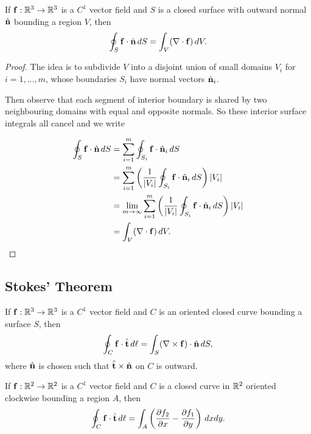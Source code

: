 \documentclass[10pt, a4paper]{article}
\begin{document}
\begin{theorem}
    If $\mbf{f} : \R ^ 3 \to \R ^ 3$ is a $C ^ {1}$ vector field and $S$ is a closed surface with outward normal $\hat{\mbf{n}}$ bounding a region $V$,
    then
    \[
    \oint_{S}\mbf{f}\cdot\hat{\mbf{n}}\,dS = \int_{V}(\bnabla \cdot \mbf{f})\,dV.
    \]

    \begin{proof}
        The idea is to subdivide $V$ into a disjoint union of small domains $V_i$ for $i = 1, \dotsc, m$,
        whose boundaries $S_i$ have normal vectors $\hat{\mbf{n}}_i$.


        Then observe that each segment of interior boundary is shared by two neighbouring domains with equal and opposite normals.
        So these interior surface integrals all cancel and we write
        
        \begin{align*}
            \oint_{S}\mbf{f} \cdot \hat{\mbf{n}}\,dS &= \sum_{i = 1}^{m}\oint_{S_i}\mbf{f} \cdot \hat{\mbf{n}}_i\,dS \\
            &= \sum_{i = 1}^{m}\left(\frac{1}{|V_i|}\oint_{S_i}\mbf{f}\cdot\hat{\mbf{n}}_i\,dS\right)|V_i| \\
            &= \lim_{m \to \infty}\sum_{i = 1}^{m}\left(\frac{1}{|V_i|}\oint_{S_i}\mbf{f} \cdot \hat{\mbf{n}}_i\,dS\right)|V_i| \\
            &= \int_{V}(\bnabla \cdot \mbf{f})\,dV.
        \end{align*}
    \end{proof}
\end{theorem}

\subsection{Stokes' Theorem}

\begin{theorem}\label{prep:mathmethII:thm:stokesthm}
    If $\mbf{f} : \R ^ 3 \to \R ^ 3$ is a $C ^ {1}$ vector field and $C$ is an oriented closed curve bounding a surface $S$,
    then
    \[
    \oint_{C}\mbf{f}\cdot\hat{\mbf{t}}\,d\ell = \int_{S}(\bnabla \times \mbf{f})\cdot\hat{\mbf{n}}\,dS,
    \]
    where $\hat{\mbf{n}}$ is chosen such that $\hat{\mbf{t}} \times \hat{\mbf{n}}$ on $C$ is outward.
\end{theorem}

\begin{corollary}
    If $\mbf{f} : \R ^ 2 \to \R ^ 2$ is a $C ^ {1}$ vector field and $C$ is a closed curve in $\R ^ 2$ oriented clockwise bounding a region $A$,
    then
    \[
    \oint_{C}\mbf{f} \cdot \hat{\mbf{t}}\,d\ell = \int_{A}\left(\pd[f_2]{x} - \pd[f_1]{y}\right)\,dxdy.
    \]
\end{corollary}
\end{document}
